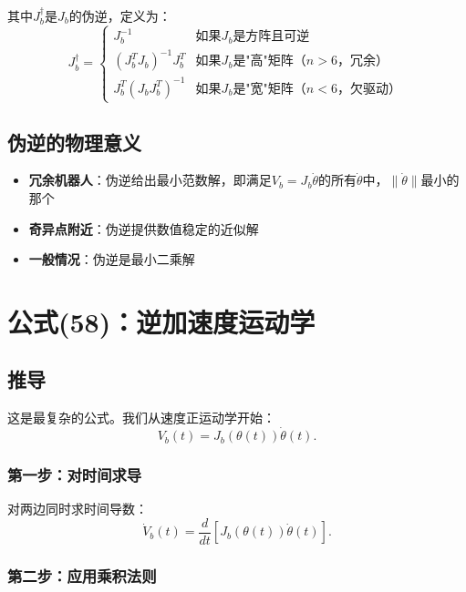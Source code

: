 \documentclass{article}
\begin{document}
其中$J_b^{\dagger}$是$J_b$的伪逆，定义为：
\begin{equation}
J_b^{\dagger} = \begin{cases}
J_b^{-1} & \text{如果$J_b$是方阵且可逆} \\
(J_b^T J_b)^{-1}J_b^T & \text{如果$J_b$是"高"矩阵（$n > 6$，冗余）} \\
J_b^T(J_b J_b^T)^{-1} & \text{如果$J_b$是"宽"矩阵（$n < 6$，欠驱动）}
\end{cases}
\end{equation}

\subsection{伪逆的物理意义}

\begin{itemize}
\item \textbf{冗余机器人}：伪逆给出最小范数解，即满足$V_b = J_b\dot{\theta}$的所有$\dot{\theta}$中，$\|\dot{\theta}\|$最小的那个
\item \textbf{奇异点附近}：伪逆提供数值稳定的近似解
\item \textbf{一般情况}：伪逆是最小二乘解
\end{itemize}

\section{公式(58)：逆加速度运动学}

\subsection{推导}

这是最复杂的公式。我们从速度正运动学开始：
\begin{equation}
V_b(t) = J_b(\theta(t))\dot{\theta}(t).
\end{equation}

\subsubsection{第一步：对时间求导}

对两边同时求时间导数：
\begin{equation}
\dot{V}_b(t) = \frac{d}{dt}[J_b(\theta(t))\dot{\theta}(t)].
\end{equation}

\subsubsection{第二步：应用乘积法则}
\end{document}
